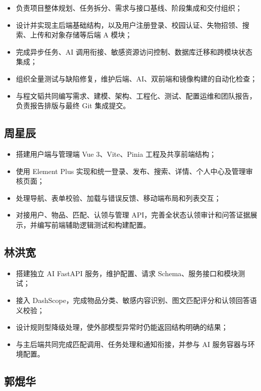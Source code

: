 \begin{itemize}
  \item 负责项目整体规划、任务拆分、需求与接口基线、阶段集成和交付组织；
  \item 设计并实现主后端基础结构，以及用户注册登录、校园认证、失物招领、搜索、上传和对象存储等后端 A 模块；
  \item 完成异步任务、AI 调用衔接、敏感资源访问控制、数据库迁移和跨模块状态集成；
  \item 组织全量测试与缺陷修复，维护后端、AI、双前端和镜像构建的自动化检查；
  \item 与程文韬共同编写需求、建模、架构、工程化、测试、配置运维和团队报告，负责报告排版与最终 Git 集成提交。
\end{itemize}

\subsection{周星辰}

\begin{itemize}
  \item 搭建用户端与管理端 Vue 3、Vite、Pinia 工程及共享前端结构；
  \item 使用 Element Plus 实现和统一登录、发布、搜索、详情、个人中心及管理审核页面；
  \item 处理导航、表单校验、加载与错误反馈、移动端布局和列表交互；
  \item 对接用户、物品、匹配、认领与管理 API，完善全状态认领审计和问答证据展示，并编写前端辅助逻辑测试和构建配置。
\end{itemize}

\subsection{林洪宽}

\begin{itemize}
  \item 搭建独立 AI FastAPI 服务，维护配置、请求 Schema、服务接口和模块测试；
  \item 接入 DashScope，完成物品分类、敏感内容识别、图文匹配评分和认领回答语义校验；
  \item 设计规则型降级处理，使外部模型异常时仍能返回结构明确的结果；
  \item 与主后端共同完成匹配调用、任务处理和通知衔接，并参与 AI 服务容器与环境配置。
\end{itemize}

\subsection{郭焜华}

